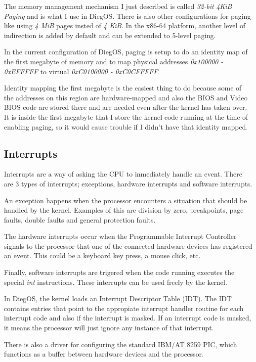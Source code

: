 \documentclass[12pt]{article}
\begin{document}
The memory management mechanism I just described is called \textit{32-bit 4KiB Paging} and is what I use in DiegOS. There is
also other configurations for paging like using \textit{4 MiB} pages insted of \textit{4 KiB}. In the x86-64
platform, another level of indirection is added by default and can be extended to 5-level paging.

In the current configuration of DiegOS, paging is setup to do an identity map of the first megabyte of memory 
and to map physical addresses \textit{0x100000 - 0xEFFFFF} to virtual \textit{0xC0100000 - 0xC0CFFFFF}.

Identity mapping the first megabyte is the easiest thing to do because some of the addresses on this region 
are hardware-mapped and also the BIOS and Video BIOS code are stored there and are needed even after 
the kernel has taken over. It is inside the first megabyte that I store the kernel code running at the 
time of enabling paging, so it would cause trouble if I didn't have that identity mapped.


\subsection*{Interrupts}

Interrupts are a way of asking the CPU to inmediately handle an event. There are 3 types of interrupts;
exceptions, hardware interrupts and software interrupts.

An exception happens when the processor encounters a situation that should be handled by the kernel.
Examples of this are division by zero, breakpoints, page faults, double faults and general protection
faults.

The hardware interrupts occur when the Programmable Interrupt Controller signals to the processor
that one of the connected hardware devices has registered an event. This could be a keyboard key press,
a mouse click, etc.

Finally, software interrupts are trigered when the code running executes the special \textit{int} 
instructions. These interrupts can be used freely by the kernel.

In DiegOS, the kernel loads an Interrupt Descriptor Table (IDT). The IDT contains
entries that point to the appropiate interrupt handler routine for each 
interrupt code and also if the interrupt is masked. If an interrupt code is masked, 
it means the processor will just ignore any instance of that interrupt.

There is also a driver for configuring the standard IBM/AT 8259 PIC, which 
functions as a buffer between hardware devices and the processor.
\end{document}
